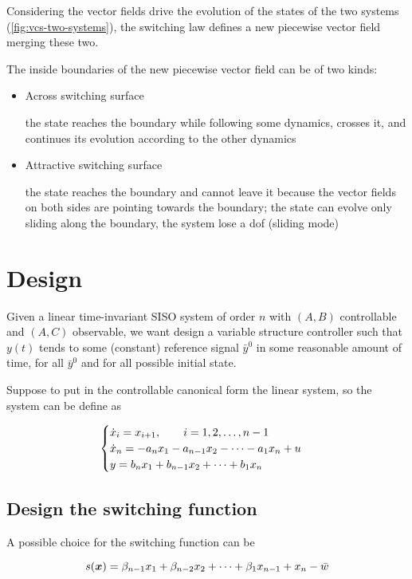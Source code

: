 Considering the vector fields drive the evolution of the states of the two systems (\cref{fig:vcs-two-systems}), the switching law defines a new piecewise vector field merging these two.

The inside boundaries of the new piecewise vector field can be of two kinds:

\begin{itemize}
    \item Across switching surface

    the state reaches the boundary while following some dynamics, crosses it, and continues its evolution according to the other dynamics

    \item Attractive switching surface

    the state reaches the boundary and cannot leave it because the vector fields on both sides are pointing towards the boundary;
    the state can evolve only sliding along the boundary, the system lose a dof (sliding mode)
\end{itemize}

\section{Design}

Given a linear time-invariant SISO system of order $n$ with $(A,B)$ controllable and $(A,C)$ observable, we want design a variable structure controller such that $y(t)$ tends to some (constant) reference signal $\bar y^0$ in some reasonable amount of time, for all $\bar y^0$ and for all possible initial state.

Suppose to put in the controllable canonical form the linear system, so the system can be define as

\[
    \begin{cases}
        \dot{x}_i = x_{i+1}, \qquad i = 1,2,\dots, n-1 \\
        \dot{x}_n = - a_n x_1 - a_{n-1} x_2 - \dots - a_1 x_n + u \\
        y = b_n x_1 + b_{n-1} x_2 + \dots + b_1 x_n
    \end{cases}
\]

\subsection{Design the switching function}

A possible choice for the switching function can be

\[
    s(\boldsymbol{x}) = \beta_{n-1} x_1 + \beta_{n-2} x_2 + \dots + \beta_1 x_{n-1} + x_n - \bar w
\]

